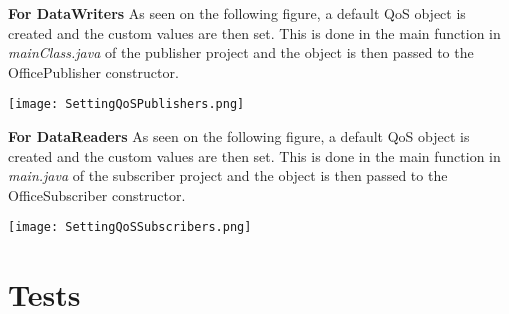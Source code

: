 \textbf{For DataWriters}
As seen on the following figure, a default QoS object is created and the custom values are then set. This is done in the main function in \textit{mainClass.java} of the publisher project and the object is then passed to the OfficePublisher constructor.
\begin{center}
	\texttt{[image: SettingQoSPublishers.png]}
\end{center}

\textbf{For DataReaders}
As seen on the following figure, a default QoS object is created and the custom values are then set. This is done in the main function in \textit{main.java} of the subscriber project and the object is then passed to the OfficeSubscriber constructor.
\begin{center}
	\texttt{[image: SettingQoSSubscribers.png]}
\end{center}

\section{Tests}
